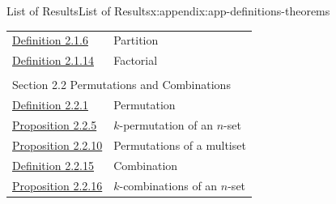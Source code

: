 \documentclass[oneside,10pt,]{book}
\numberwithin{equation}{section}
\begin{document}
\begin{appendixptx}{List of Results}{}{List of Results}{}{}{x:appendix:app-definitions-theorems}
\begin{longtable}[l]{ll}
\hyperref[x:definition:def-partition]{Definition 2.1.6}& Partition\\
\hyperref[x:definition:def-factorial]{Definition 2.1.14}& Factorial\\
\multicolumn{2}{l}{\null}\\[1.5ex] \multicolumn{2}{l}{\large Section 2.2 Permutations and Combinations}\\[0.5ex]
\hyperref[x:definition:def-permutation]{Definition 2.2.1}& Permutation\\
\hyperref[x:proposition:prop-Pnk]{Proposition 2.2.5}& \(k\)-permutation of an \(n\)-set\\
\hyperref[x:proposition:prop-perm-repeat]{Proposition 2.2.10}& Permutations of a multiset\\
\hyperref[x:definition:def-combination]{Definition 2.2.15}& Combination\\
\hyperref[x:proposition:prop-comb]{Proposition 2.2.16}& \(k\)-combinations of an \(n\)-set\\
\end{longtable}
\end{appendixptx}
%
%
\typeout{************************************************}
\typeout{************************************************}
%
\end{document}
